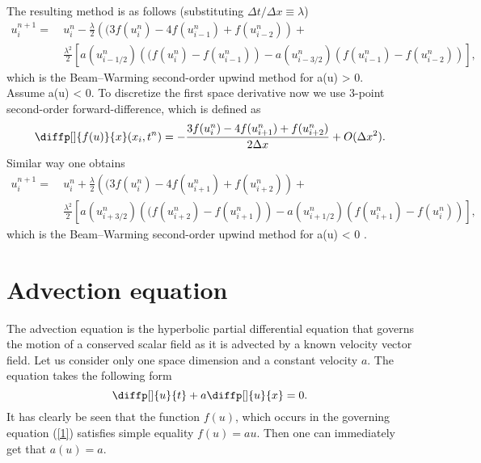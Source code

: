 \documentclass[a4paper, 10pt]{article}
\begin{document}
The resulting method is as follows (substituting $ \Delta t/ \Delta x \equiv \lambda $)
\begin{equation}
\label{8}
\begin{split}
u_i^{n+1} = \:& u_i^n - \frac{\lambda}{2}\left((3f(u_i^n) - 4f(u_{i-1}^n) + f(u_{i-2}^n)\right) + \\
& \frac{\lambda^2}{2}\left[ a(u_{i-1/2}^n) \left((f(u_{i}^n) - f(u_{i-1}^n)\right) - a(u_{i-3/2}^n) \left(f(u_{i-1}^n) - f(u_{i-2}^n)\right)\right],
\end{split}
\end{equation}
which is the Beam--Warming second-order upwind method for a(u) > 0.\\

Assume a(u) < 0. To discretize the first space derivative now we use 3-point second-order forward-difference, which is defined as
\begin{equation}
\label{9}
\diffp[]{f(u)}{x} (x_i, t^n) = - \frac{3f(u_{i}^n) - 4f(u_{i+1}^n) + f(u_{i+2}^n)}{2 \Delta x} + O(\Delta x^{2}).
\end{equation}
Similar way one obtains
\begin{equation}
\label{10}
\begin{split}
u_i^{n+1} = \:& u_i^n + \frac{\lambda}{2}\left((3f(u_i^n) - 4f(u_{i+1}^n) + f(u_{i+2}^n)\right) + \\
& \frac{\lambda^2}{2}\left[ a(u_{i+3/2}^n) \left((f(u_{i+2}^n) - f(u_{i+1}^n)\right) - a(u_{i+1/2}^n) \left(f(u_{i+1}^n) - f(u_{i}^n)\right)\right],
\end{split}
\end{equation}
which is the Beam--Warming second-order upwind method for a(u) < 0 \cite{laney}.

\section{Advection equation}
The advection equation is the hyperbolic partial differential equation that governs the motion of a conserved scalar field as it is advected by a known velocity vector field. Let us consider only one space dimension and a constant velocity $ a $. The equation takes the following form
\begin{equation}
\label{11}
\diffp[]{u}{t} + a \diffp[]{u}{x} = 0.
\end{equation}
It has clearly be seen that the function $ f(u) $, which occurs in the governing equation (\ref{1}) satisfies simple equality $ f(u) = a u $. Then one can immediately get that $ a(u) = a $.
\end{document}
